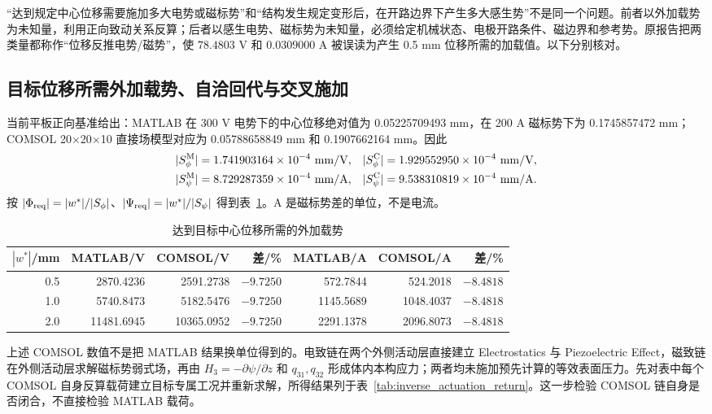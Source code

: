 \documentclass[UTF8,fontset=windows,11pt,a4paper]{ctexart}
\begin{document}
“达到规定中心位移需要施加多大电势或磁标势”和“结构发生规定变形后，在开路边界下产生多大感生势”不是同一个问题。前者以外加载势为未知量，利用正向致动关系反算；后者以感生电势、磁标势为未知量，必须给定机械状态、电极开路条件、磁边界和参考势。原报告把两类量都称作“位移反推电势/磁势”，使 $78.4803$ V 和 $0.0309000$ A 被误读为产生 0.5 mm 位移所需的加载值。以下分别核对。

\subsection{目标位移所需外加载势、自洽回代与交叉施加}

当前平板正向基准给出：MATLAB 在 300 V 电势下的中心位移绝对值为 0.05225709493 mm，在 200 A 磁标势下为 0.1745857472 mm；COMSOL 20$\times$20$\times$10 直接场模型对应为 0.05788658849 mm 和 0.1907662164 mm。因此
\[
\begin{aligned}
|S_\phi^{\mathrm M}|&=1.741903164\times10^{-4}\ {\rm mm/V},&
|S_\phi^{\mathrm C}|&=1.929552950\times10^{-4}\ {\rm mm/V},\\
|S_\psi^{\mathrm M}|&=8.729287359\times10^{-4}\ {\rm mm/A},&
|S_\psi^{\mathrm C}|&=9.538310819\times10^{-4}\ {\rm mm/A}.
\end{aligned}
\]
按 $|\Phi_{\rm req}|=|w^*|/|S_\phi|$、$|\Psi_{\rm req}|=|w^*|/|S_\psi|$ 得到表~\ref{tab:inverse_actuation_loads}。A 是磁标势差的单位，不是电流。

\begin{table}[H]
\centering
\caption{达到目标中心位移所需的外加载势}
\label{tab:inverse_actuation_loads}
\scriptsize
\begin{tabular}{rrrrrrr}
\toprule
$|w^*|$/mm & MATLAB/V & COMSOL/V & 差/\% & MATLAB/A & COMSOL/A & 差/\% \\
\midrule
0.5 & 2870.4236 & 2591.2738 & $-9.7250$ & 572.7844 & 524.2018 & $-8.4818$ \\
1.0 & 5740.8473 & 5182.5476 & $-9.7250$ & 1145.5689 & 1048.4037 & $-8.4818$ \\
2.0 & 11481.6945 & 10365.0952 & $-9.7250$ & 2291.1378 & 2096.8073 & $-8.4818$ \\
\bottomrule
\end{tabular}
\end{table}

上述 COMSOL 数值不是把 MATLAB 结果换单位得到的。电致链在两个外侧活动层直接建立 Electrostatics 与 Piezoelectric Effect，磁致链在外侧活动层求解磁标势弱式场，再由 $H_3=-\partial\psi/\partial z$ 和 $q_{31},q_{32}$ 形成体内本构应力；两者均未施加预先计算的等效表面压力。先对表中每个 COMSOL 自身反算载荷建立目标专属工况并重新求解，所得结果列于表~\ref{tab:inverse_actuation_return}。这一步检验 COMSOL 链自身是否闭合，不直接检验 MATLAB 载荷。
\end{document}
